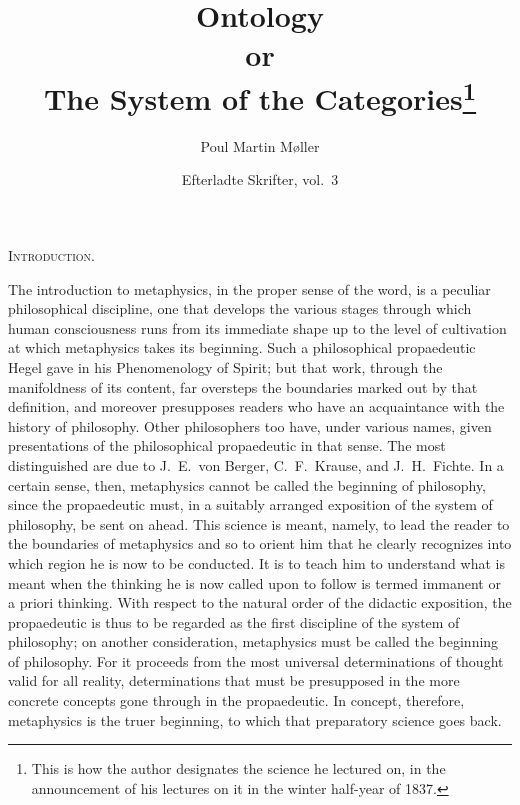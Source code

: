 \documentclass[12pt]{article}
\title{\textbf{Ontology}\\[0.3em]
  \large or\\[0.3em]
  \textbf{The System of the Categories}\footnote{This is how the author
  designates the science he lectured on, in the announcement of his lectures on
  it in the winter half-year of 1837.}}
\author{Poul Martin Møller}
\date{Efterladte Skrifter, vol.\ 3}
\newcommand{\opage}[1]{\marginnote{\footnotesize\textit{[#1]}}}
\begin{document}
\maketitle

\begin{center}\textsc{Introduction.}\end{center}

\opage{189}The introduction to metaphysics, in the proper sense of the word, is a
peculiar philosophical discipline, one that develops the various stages through
which human consciousness runs from its immediate shape up to the level of
cultivation at which metaphysics takes its beginning. Such a philosophical
propaedeutic Hegel gave in his Phenomenology of Spirit; but that work, through
the manifoldness of its content, far oversteps the boundaries marked out by that
definition, and moreover presupposes readers who have an acquaintance with the
history of philosophy. Other philosophers too have, under various names, given
presentations of the philosophical propaedeutic in that sense. The most
distinguished are due to J.\ E.\ von Berger, C.\ F.\ Krause, and J.\ H.\ Fichte.
In a certain sense, then, metaphysics cannot be called the beginning of
philosophy, since the propaedeutic must, in a suitably arranged exposition of the
system of philosophy, be sent on ahead. This \opage{190}science is meant, namely,
to lead the reader to the boundaries of metaphysics and so to orient him that he
clearly recognizes into which region he is now to be conducted. It is to teach
him to understand what is meant when the thinking he is now called upon to follow
is termed immanent or a priori thinking. With respect to the natural order of the
didactic exposition, the propaedeutic is thus to be regarded as the first
discipline of the system of philosophy; on another consideration, metaphysics
must be called the beginning of philosophy. For it proceeds from the most
universal determinations of thought valid for all reality, determinations that
must be presupposed in the more concrete concepts gone through in the
propaedeutic. In concept, therefore, metaphysics is the truer beginning, to which
that preparatory science goes back.
\end{document}
